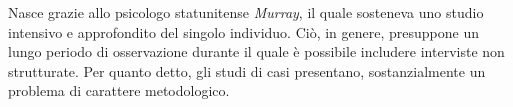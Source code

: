 \documentclass{subfiles}
\begin{document}
Nasce grazie allo psicologo statunitense \emph{Murray}, il quale sosteneva uno studio intensivo e approfondito del singolo individuo.
Ciò, in genere, presuppone un lungo periodo di osservazione durante il quale è possibile includere interviste non strutturate.
Per quanto detto, gli studi di casi presentano, sostanzialmente un problema di carattere metodologico.
\end{document}

